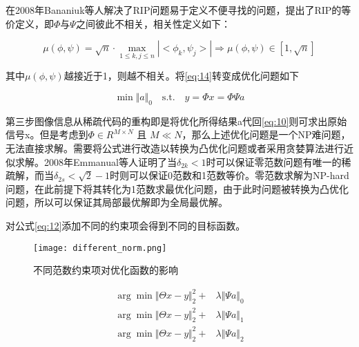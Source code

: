 在2008年Bananiuk等人\cite{Compressive_sensing_[Lecture_Notes]}解决了RIP问题易于定义不便寻找的问题，提出了RIP的等价定义，即$\Phi$与$\Psi$之间彼此不相关，相关性定义如下：

\begin{equation}
  \label{eq:11}
  \mu(\phi, \psi) = \sqrt{n} \cdot \mathop{\max}_{1 \leq k,j \leq n} |<\phi_k,\psi_j>| \Rightarrow \mu(\phi, \psi) \in \left[ 1,\sqrt{n}  \right]
\end{equation}

其中$\mu(\phi, \psi)$越接近于1，则越不相关。将\ref{eq:14}转变成优化问题如下

\begin{equation}
  \label{eq:12}
  \min \Vert a \Vert_0 \quad \text{s.t.} \quad y = \Phi x = \Phi \Psi a
\end{equation}

第三步图像信息从稀疏代码的重构即是将优化所得结果a代回\ref{eq:10}则可求出原始信号x。但是考虑到$\Phi \in R^{M \times N}$ 且  $M \ll N$，那么上述优化问题是一个NP难问题，无法直接求解。需要将公式进行改造以转换为凸优化问题或者采用贪婪算法进行近似求解。2008年Emmanual等人\cite{The_restricted_isometry_property_and_its_implications_for_compressed_sensing}证明了当$\delta_{2k} < 1$时可以保证零范数问题有唯一的稀疏解，而当$\delta_{2s}<\sqrt2-1$时则可以保证0范数和1范数等价。零范数求解为NP-hard问题，在此前提下将其转化为1范数求最优化问题，由于此时问题被转换为凸优化问题，所以可以保证其局部最优解即为全局最优解。

对公式\ref{eq:12}添加不同的约束项会得到不同的目标函数。

\begin{figure}[ht]
  \centering
  \texttt{[image: different\_norm.png]}
  \caption{不同范数约束项对优化函数的影响}
  \label{fig:different_norm_fig}
\end{figure}

\begin{equation}
  \begin{aligned}
    \arg\min \Vert \Theta x - y \Vert_2^2 + & \lambda \Vert \Psi a \Vert_0 \\
    \arg\min \Vert \Theta x - y \Vert_2^2 + & \lambda \Vert \Psi a \Vert_1 \\
    \arg\min \Vert \Theta x - y \Vert_2^2 + & \lambda \Vert \Psi a \Vert_2
  \end{aligned}
  \label{eq:different_norm}
\end{equation}

